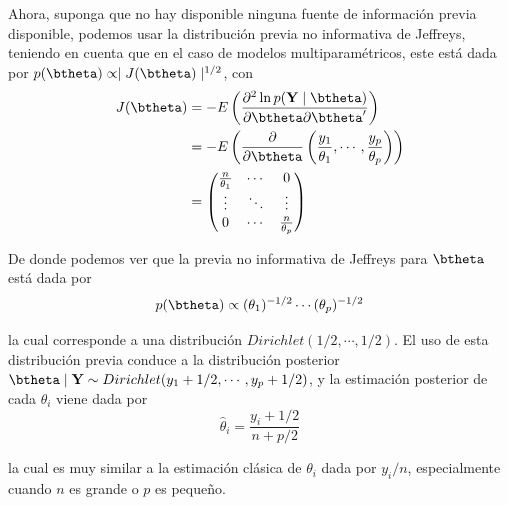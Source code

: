 \documentclass[10pt,openright]{book}\usepackage[]{graphicx}\usepackage[]{color}
\begin{document}
Ahora, suponga que no hay disponible ninguna fuente de informaci\'on previa disponible, podemos usar la distribuci\'on previa no informativa de Jeffreys, teniendo en cuenta que en el caso de modelos multiparam\'etricos, este est\'a dada por $p(\btheta)\propto \mid J(\btheta)\mid^{1/2}$, con 
\begin{align*}
J(\btheta)&=-E\left(\dfrac{\partial^2 \ln p(\mathbf{Y}\mid\btheta)}{\partial\btheta\partial\btheta'}\right)\\
&=-E\left(\dfrac{\partial}{\partial\btheta}\left(\frac{y_1}{\theta_1},\cdots,\frac{y_p}{\theta_p}\right)\right)\\
&=\begin{pmatrix}\frac{n}{\theta_1}&\cdots&0\\
\vdots&\ddots&\vdots\\0&\cdots&\frac{n}{\theta_p}\end{pmatrix}
\end{align*}

De donde podemos ver que la previa no informativa de Jeffreys para $\btheta$ est\'a dada por 
\begin{equation*}
p(\btheta)\propto(\theta_1)^{-1/2}\cdots(\theta_p)^{-1/2}
\end{equation*}

la cual corresponde a una distribuci\'on $Dirichlet(1/2,\cdots,1/2)$. El uso de esta distribuci\'on previa conduce a la distribuci\'on posterior $\btheta\mid\mathbf{Y}\sim Dirichlet(y_1+1/2,\cdots,y_p+1/2)$, y la estimaci\'on posterior de cada $\theta_i$ viene dada por 
\begin{equation*}
\hat{\theta}_i=\frac{y_i+1/2}{n+p/2}
\end{equation*}

la cual es muy similar a la estimaci\'on cl\'asica de $\theta_i$ dada por $y_i/n$, especialmente cuando $n$ es grande o $p$ es peque\~no.
\end{document}
